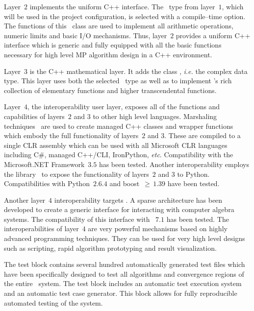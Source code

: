 Layer~$2$ implements the uniform C++ interface.
The \efloatclass\ type from layer~$1$, which will be used in the
project configuration, is selected with a
compile--time option. The functions of this \efloatclass\
class are used to implement all arithmetic operations,
numeric limits and basic I/O mechanisms.
Thus, layer~$2$ provides a uniform C++ interface which is
generic and fully equipped with all the basic functions
necessary for high level MP algorithm design in a C++ environment.

Layer~$3$ is the C++ mathematical layer.
It adds the class {},
{\emph{i.e.}} the complex data type. 
This layer uses both the selected \efloatclass\
type as well as {}
to implement \efloat 's rich collection of elementary functions and higher
transcendental functions.

Layer~$4$, the interoperability user layer, exposes all of the
functions and capabilities of layers~$2$ and $3$ to other
high level languages. Marshaling techniques~\cite{richterclr:textbook}
are used to create managed C++ classes and wrapper functions
which embody the full functionality of layers~$2$ and $3$.
These are compiled to a single CLR assembly which can be used with
all Microsoft{\footnotesize {\textregistered}} CLR
languages including C\#, managed C++/CLI, Iron\-Python, {\emph{etc}}.
Compatibility with the
Microsoft{\footnotesize {\textregistered}}.NET Framework~$3$.$5$ has been tested.
Another interoperability employs the {}
library~\cite{boostpython:website} to
expose the functionality of layers~$2$ and $3$ to Python.
Compatibilities with Python~$2$.$6$.$4$ and boost~$\geq\,1$.$39$
have been tested.

Another layer~$4$ interoperability targets \mathematica.
A sparse architecture has been developed to create a generic interface
for interacting with computer algebra systems. The compatibility
of this interface with \mathematica~$7$.$1$ has been tested.
The interoperabilities of layer~$4$ are very powerful mechanisms
based on highly advanced programming techniques.
They can be used for very high level designs such as
scripting, rapid algorithm prototyping and result visualization.

The test block contains several hundred automatically
generated test files which have been specifically designed to test all
algorithms and convergence regions of the entire \efloat\ system.
The test block includes an automatic test execution system and an automatic
test case generator. This block allows for fully reproducible automated
testing of the system.


